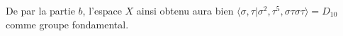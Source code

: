 \documentclass[11pt, a4paper]{article}
\begin{document}
De par la partie $b$, l'espace $X$ ainsi obtenu aura bien $\langle \sigma, \tau | \sigma^{2}, \tau^{5}, \sigma\tau\sigma \tau \rangle = D_{10}  $ comme groupe fondamental.
\end{document}
